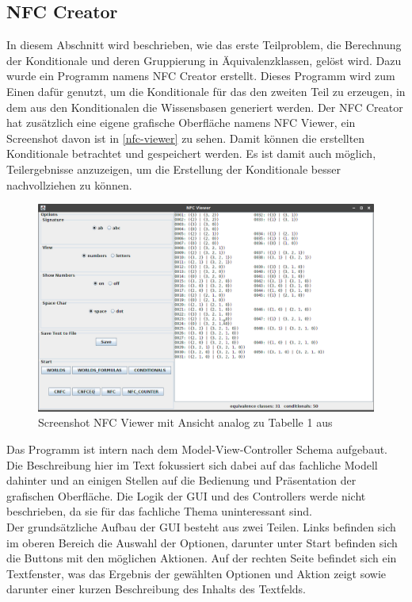 \documentclass[12pt,a4paper]{article}
\begin{document}
\subsection{NFC Creator}
In diesem Abschnitt wird beschrieben, wie das erste Teilproblem, die Berechnung der Konditionale und deren Gruppierung in Äquivalenzklassen, gelöst wird. Dazu wurde ein Programm namens NFC Creator erstellt. Dieses Programm wird zum Einen dafür genutzt, um die Konditionale für das den zweiten Teil zu erzeugen, in dem aus den Konditionalen die Wissensbasen generiert werden. Der NFC Creator hat zusätzlich eine eigene grafische Oberfläche namens NFC Viewer, ein Screenshot davon ist in \autoref{nfc-viewer} zu sehen. Damit können die erstellten Konditionale betrachtet und gespeichert werden. Es ist damit auch möglich, Teilergebnisse anzuzeigen, um die Erstellung der Konditionale besser nachvollziehen zu können. \\
\begin{figure}
\includegraphics[width=0.8\linewidth]{bilder/nfc-viewer.png}

\caption{Screenshot NFC Viewer mit Ansicht analog zu Tabelle 1 aus \cite{beierle19}}
\label{nfc-viewer}
\end{figure}
Das Programm ist intern nach dem Model-View-Controller Schema aufgebaut. Die Beschreibung hier im Text fokussiert sich dabei auf das fachliche Modell dahinter und an einigen Stellen auf die Bedienung und Präsentation der grafischen Oberfläche. Die Logik der GUI und des Controllers werde nicht beschrieben, da sie für das fachliche Thema uninteressant sind. \\
Der grundsätzliche Aufbau der GUI besteht aus zwei Teilen. Links befinden sich im oberen Bereich die Auswahl der Optionen, darunter unter Start befinden sich die Buttons mit den möglichen Aktionen. Auf der rechten Seite befindet sich ein Textfenster, was das Ergebnis der gewählten Optionen und Aktion zeigt sowie darunter einer kurzen Beschreibung des Inhalts des Textfelds. \\
\end{document}
